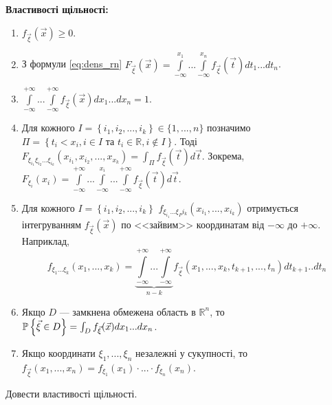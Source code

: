 \noindent \textbf{Властивості щільності:}
\begin{enumerate}
    \item $f_{\vec{\xi}}(\vec{x}) \geq 0$.
    \item З формули \eqref{eq:dens_rn} $F_{\vec{\xi}}(\vec{x}) = 
    \int\limits_{-\infty}^{x_1}...\int\limits_{-\infty}^{x_n}
    f_{\vec{\xi}} (\vec{t})dt_1...dt_n$.
    \item $\int\limits_{-\infty}^{+\infty}...\int\limits_{-\infty}^{+\infty}
    f_{\vec{\xi}} (\vec{x})dx_1...dx_n = 1$.
    \item Для кожного $I = \left\{i_1, i_2, ..., i_k\right\} \in \{1,...,n\}$
    позначимо $\Pi = \left\{t_{i} < x_{i} , i \in I \text{ та } t_i \in \mathbb{R}, i \notin I\right\}$.
    Тоді $F_{\xi_{i_1} \xi_{i_2} ... \xi_{i_k}}(x_{i_1}, x_{i_2}, ..., x_{x_k}) = \int_{\Pi} f_{\vec{\xi}}(\vec{t}) d\vec{t}$.
    Зокрема, 
    $F_{\xi_i}(x_i) = \int\limits_{-\infty}^{+\infty}...
    \int\limits_{-\infty}^{x_i}...\int\limits_{-\infty}^{+\infty}
    f_{\vec{\xi}} (\vec{t})d\vec{t}$.

    \item Для кожного $I = \left\{i_1, i_2, ..., i_k\right\}$ $f_{\xi_{i_1}...\xi_Pi_k}(x_{i_1}, ..., x_{i_k})$ отримується
    інтегруванням $f_{\vec{\xi}}(\vec{x})$ по <<зайвим>> координатам від $-\infty$ до $+\infty$. Наприклад, 
    $$f_{\xi_1 ... \xi_k} (x_1, ..., x_k) = 
    \underbrace{
        \int\limits_{-\infty}^{+\infty} 
        ... 
        \int\limits_{-\infty}^{+\infty}
    }_{n-k} f_{\vec{\xi}}(x_1,...,x_k, t_{k+1}, ..., t_n) dt_{k+1}..dt_n$$
    \item Якщо $D$ --- замкнена обмежена область в $\mathbb{R}^n$, то
    $\P\left\{\vec{\xi} \in D\right\} = \int_D f_{\vec{\xi}}(\vec{x})
    dx_1 ... dx_n$.
    \item Якщо координати $\xi_1, ..., \xi_n$ незалежні у сукупності, то 
    $f_{\vec{\xi}} (x_1, ..., x_n) = f_{\xi_1}(x_1) \cdot ... \cdot f_{\xi_n}(x_n)$.
\end{enumerate}
\begin{exercise}
    Довести властивості щільності.
\end{exercise}